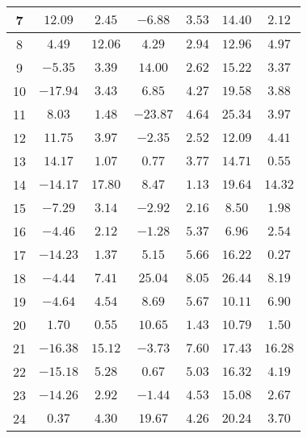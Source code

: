 \begin{table}[H]
\begin{tabular}{|c|c|c|c|c|c|c|}
                        7    &  $12.09$    &  $2.45$   &  $-6.88$   &  $3.53$  &  $14.40$ &  $2.12$   \\ \hline
                        8    &  $4.49$     &  $12.06$  &  $4.29$    &  $2.94$  &  $12.96$ &  $4.97$   \\ \hline
                        9    &  $-5.35$    &  $3.39$   &  $14.00$   &  $2.62$  &  $15.22$ &  $3.37$   \\ \hline
                        10   &  $-17.94$   &  $3.43$   &  $6.85$    &  $4.27$  &  $19.58$ &  $3.88$   \\ \hline
                        11   &  $8.03$     &  $1.48$   &  $-23.87$  &  $4.64$  &  $25.34$ &  $3.97$   \\ \hline
                        12   &  $11.75$    &  $3.97$   &  $-2.35$   &  $2.52$  &  $12.09$ &  $4.41$   \\ \hline
                        13   &  $14.17$    &  $1.07$   &  $0.77$    &  $3.77$  &  $14.71$ &  $0.55$   \\ \hline
                        14   &  $-14.17$   &  $17.80$  &  $8.47$    &  $1.13$  &  $19.64$ &  $14.32$  \\ \hline
                        15   &  $-7.29$    &  $3.14$   &  $-2.92$   &  $2.16$  &  $8.50$  &  $1.98$   \\ \hline
                        16   &  $-4.46$    &  $2.12$   &  $-1.28$   &  $5.37$  &  $6.96$  &  $2.54$   \\ \hline
                        17   &  $-14.23$   &  $1.37$   &  $5.15$    &  $5.66$  &  $16.22$ &  $0.27$   \\ \hline
                        18   &  $-4.44$    &  $7.41$   &  $25.04$   &  $8.05$  &  $26.44$ &  $8.19$   \\ \hline
                        19   &  $-4.64$    &  $4.54$   &  $8.69$    &  $5.67$  &  $10.11$ &  $6.90$   \\ \hline
                        20   &  $1.70$     &  $0.55$   &  $10.65$   &  $1.43$  &  $10.79$ &  $1.50$   \\ \hline
                        21   &  $-16.38$   &  $15.12$  &  $-3.73$   &  $7.60$  &  $17.43$ &  $16.28$  \\ \hline
                        22   &  $-15.18$   &  $5.28$   &  $0.67$    &  $5.03$  &  $16.32$ &  $4.19$   \\ \hline
                        23   &  $-14.26$   &  $2.92$   &  $-1.44$   &  $4.53$  &  $15.08$ &  $2.67$   \\ \hline
                        24   &  $0.37$     &  $4.30$   &  $19.67$   &  $4.26$  &  $20.24$ &  $3.70$   \\ \hline

\end{tabular}
\end{table}
